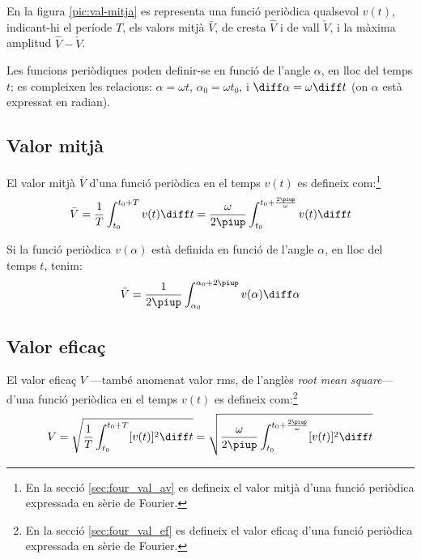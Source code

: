 En la figura \vref{pic:val-mitja} es representa una funció periòdica qualsevol $v(t)$, indicant-hi el període $T$, els valors mitjà $\bar{V}$, de cresta $\hat{V}$ i de vall $\check{V}$, i la màxima amplitud  $\hat{V}-\check{V}$.
\begin{center}
    
    \label{pic:val-mitja}
\end{center}

Les funcions periòdiques poden  definir-se en funció de l'angle $\alpha$, en lloc del temps $t$; es compleixen les relacions:
$\alpha=\omega t$, $\alpha_0=\omega t_0$, i $\diff\alpha=\omega\diff t$ (on $\alpha$ està expressat  en radian).

\subsection{Valor mitjà}

El valor mitjà $\bar{V}$ d'una funció
periòdica en el temps $v(t)$ es
defineix com:\footnote{En la secció \ref{sec:four_val_av} es defineix el valor mitjà d'una funció periòdica expressada en sèrie de Fourier.}
\begin{equation}
    \bar{V} = \frac{1}{T} \int_{t_0}^{t_0+T} v(t) \diff t =
    \frac{\omega}{2\piup} \int_{t_0}^{t_0+\frac{2\piup}{\omega}} v(t) \diff t\label{eq:vm_t}
\end{equation}

Si la funció periòdica $v(\alpha)$ està definida en funció de
l'angle $\alpha$, en lloc del temps $t$, tenim:
\begin{equation}
    \bar{V} = \frac{1}{2\piup} \int_{\alpha_0}^{\alpha_0+2\piup} v(\alpha) \diff \alpha
    \label{eq:vm_alfa}
\end{equation}

\subsection{Valor eficaç}

El valor eficaç  $V$ ---també anomenat valor rms, de l'anglès \textit{root mean square}--- d'una funció periòdica en el temps $v(t)$ es defineix com:\footnote{En la secció \ref{sec:four_val_ef} es defineix el valor eficaç d'una funció periòdica expressada en sèrie de Fourier.}
\begin{equation}
    V = \sqrt{\frac{1}{T} \int_{t_0}^{t_0+T} [v(t)]^2 \diff
    t} = \sqrt{\frac{\omega}{2\piup} \int_{t_0}^{t_0+\frac{2\piup}{\omega}}
     [v(t)]^2 \diff t}
\end{equation}

